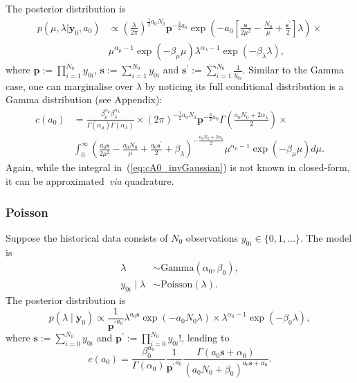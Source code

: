 \documentclass[a4paper, notitlepage, 11pt]{article}
\begin{document}
The posterior distribution is
\begin{align}
  \nonumber
 p(\mu, \lambda | \boldsymbol y_0, a_0) &\propto \left(\frac{\lambda}{2\pi}\right)^{\frac{1}{2}a_0N_0} \boldsymbol p^{-\frac{3}{2} a_0} \exp\left( -a_0\left[ \frac{\boldsymbol s}{2\mu^2} -\frac{N_0}{\mu} + \frac{\boldsymbol s^\prime}{2} \right]\lambda\right) \times \\
 \label{eq:posterior_invGauss}
 &\mu^{\alpha_\mu-1}\exp(-\beta_\mu \mu) \lambda^{\alpha_\lambda -1} \exp(-\beta_\lambda  \lambda),
\end{align}
where  $\boldsymbol p := \prod_{i =1}^{N_0} y_{0i}$,  $\boldsymbol s := \sum_{i =1}^{N_0} y_{0i}$ and $\boldsymbol s^\prime := \sum_{i =1}^{N_0} \frac{1}{y_{0i}}$.
Similar to the Gamma case, one can marginalise over $\lambda$ by noticing its full conditional distribution is a Gamma distribution (see Appendix):
\begin{align}
 \nonumber
 c(a_0) &= \frac{\beta_\mu^{\alpha_\mu}\beta_\lambda^{\alpha_\lambda} }{\Gamma(\alpha_\mu)\Gamma(\alpha_\lambda)} \times (2\pi)^{-\frac{1}{2}a_0N_0} \boldsymbol p^{-\frac{3}{2} a_0} \Gamma\left( \frac{a_0N_0 + 2\alpha_\lambda}{2} \right) \times \\
 \label{eq:cA0_invGaussian}
 & \int_0^\infty \left( \frac{a_0\boldsymbol s}{2\mu^2} -\frac{a_0N_0}{\mu} + \frac{ a_0 \boldsymbol s^\prime}{2} + \beta_\lambda \right)^{-\frac{a_0N_0 + 2\alpha_\lambda}{2}} \mu^{\alpha_\mu-1}\exp(-\beta_\mu \mu) d\mu.
\end{align}
Again, while the integral in~(\ref{eq:cA0_invGaussian}) is not known in closed-form, it can be approximated~\textit{via} quadrature.

\subsubsection{Poisson}
\label{sec:poisson_ex}

Suppose the historical data consists of $N_0$ observations $y_{0i} \in \{0, 1, \ldots \}$.
The model is 
\begin{align*}
 \lambda &\sim \text{Gamma}(\alpha_0, \beta_0),\\
 y_{0i} \mid \lambda &\sim \text{Poisson}(\lambda).
\end{align*}
The posterior distribution is 
\begin{equation}
 p(\lambda \mid \boldsymbol y_0) \propto \frac{1}{\boldsymbol {p^\prime}^{a_0} } \lambda^{a_0\boldsymbol s} \exp(-a_0 N_0 \lambda) \times \lambda^{\alpha_0-1} \exp(-\beta_0\lambda),
\end{equation}
where $\boldsymbol s := \sum_{i=0}^{N_0} y_{0i}$ and $\boldsymbol p^\prime := \prod_{i = 0}^{N_0} y_{0i}!$, leading to
\begin{equation}
 \label{eq:cA0_poisson}
 c(a_0) = \frac{\beta_0^{\alpha_0}}{\Gamma(\alpha_0)}\frac{1}{\boldsymbol {p^\prime}^{a_0} } \frac{\Gamma(a_0\boldsymbol s + \alpha_0)}{\left( a_0N_0 + \beta_0 \right)^{a_0\boldsymbol s + \alpha_0} }.
\end{equation}
\end{document}
